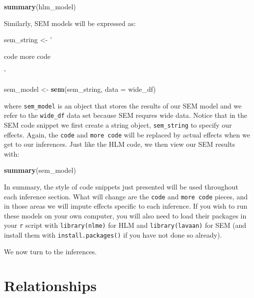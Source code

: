 \documentclass[english,,man]{apa6}
\newenvironment{Shaded}{\begin{snugshade}}{\end{snugshade}}
\newcommand{\DataTypeTok}[1]{\textcolor[rgb]{0.13,0.29,0.53}{#1}}
\newcommand{\KeywordTok}[1]{\textcolor[rgb]{0.13,0.29,0.53}{\textbf{#1}}}
\newcommand{\NormalTok}[1]{#1}
\newcommand{\StringTok}[1]{\textcolor[rgb]{0.31,0.60,0.02}{#1}}
\theoremstyle{definition}
\theoremstyle{definition}
\theoremstyle{definition}
\theoremstyle{remark}
\begin{document}
\begin{Shaded}
\begin{Highlighting}[]
\KeywordTok{summary}\NormalTok{(hlm_model)}
\end{Highlighting}
\end{Shaded}

\noindent Similarly, SEM models will be expressed as:

\begin{Shaded}
\begin{Highlighting}[]
\NormalTok{sem_string <-}\StringTok{ '}

\StringTok{    code}
\StringTok{    more code}

\StringTok{'}

\NormalTok{sem_model <-}\StringTok{ }\KeywordTok{sem}\NormalTok{(sem_string, }
                 \DataTypeTok{data =}\NormalTok{ wide_df)}
\end{Highlighting}
\end{Shaded}

\noindent where \texttt{sem\_model} is an object that stores the results
of our SEM model and we refer to the \texttt{wide\_df} data set because
SEM requres wide data. Notice that in the SEM code snippet we first
create a string object, \texttt{sem\_string} to specify our effects.
Again, the \texttt{code} and \texttt{more\ code} will be replaced by
actual effects when we get to our inferences. Just like the HLM code, we
then view our SEM results with:

\begin{Shaded}
\begin{Highlighting}[]
\KeywordTok{summary}\NormalTok{(sem_model)}
\end{Highlighting}
\end{Shaded}

In summary, the style of code snippets just presented will be used
throughout each inference section. What will change are the
\texttt{code} and \texttt{more\ code} pieces, and in those areas we will
impute effects specific to each inference. If you wish to run these
models on your own computer, you will also need to load their packages
in your \texttt{r} script with \texttt{library(nlme)} for HLM and
\texttt{library(lavaan)} for SEM (and install them with
\texttt{install.packages()} if you have not done so already).

We now turn to the inferences.

\hypertarget{relationships-2}{%
\section{Relationships}\label{relationships-2}}
\end{document}
